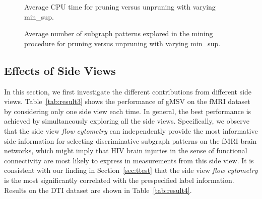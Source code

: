 \documentclass[conference]{IEEEtran}
\newcommand{\galgo}[0]{gMSV}
\newcommand{\flo}[0]{\emph{flow cytometry}}
\begin{document}
\begin{figure}
\centering
\caption{Average CPU time for pruning versus unpruning with varying min\_sup.}\label{fig:time}
\end{figure}\begin{figure}
\centering
\caption{Average number of subgraph patterns explored in the mining procedure for pruning versus unpruning with varying min\_sup.}\label{fig:num_fea}
\end{figure}\subsection{Effects of Side Views}

In this section, we first investigate the different contributions from different side views. Table~\ref{tab:result3} shows the performance of {\galgo} on the fMRI dataset by considering only one side view each time. In general, the best performance is achieved by simultaneously exploring all the side views. Specifically, we observe that the side view {\flo} can independently provide the most informative side information for selecting discriminative subgraph patterns on the fMRI brain networks, which might imply that HIV brain injuries in the sense of functional connectivity are most likely to express in measurements from this side view. It is consistent with our finding in Section~\ref{sec:ttest} that the side view {\flo} is the most significantly correlated with the prespecified label information. Results on the DTI dataset are shown in Table~\ref{tab:result4}.
\end{document}
